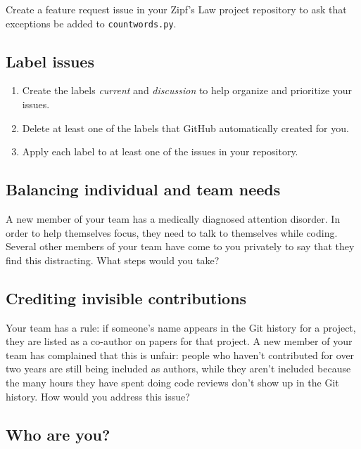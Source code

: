 \documentclass[
]{krantz}
\providecommand{\tightlist}{%
  \setlength{\itemsep}{0pt}\setlength{\parskip}{0pt}}
\begin{document}
Create a feature request issue in your Zipf's Law project repository
to ask that exceptions be added to \texttt{countwords.py}.

\hypertarget{teams-ex-label}{%
\subsection{Label issues}\label{teams-ex-label}}

\begin{enumerate}
\def\labelenumi{\arabic{enumi}.}
\tightlist
\item
  Create the labels \emph{current} and \emph{discussion}
  to help organize and prioritize your issues.
\item
  Delete at least one of the labels that GitHub automatically created for you.
\item
  Apply each label to at least one of the issues in your repository.
\end{enumerate}

\hypertarget{teams-ex-balancing}{%
\subsection{Balancing individual and team needs}\label{teams-ex-balancing}}

A new member of your team has a medically diagnosed attention disorder.
In order to help themselves focus,
they need to talk to themselves while coding.
Several other members of your team have come to you privately
to say that they find this distracting.
What steps would you take?

\hypertarget{teams-ex-invisible}{%
\subsection{Crediting invisible contributions}\label{teams-ex-invisible}}

Your team has a rule:
if someone's name appears in the Git history for a project,
they are listed as a co-author on papers for that project.
A new member of your team has complained that this is unfair:
people who haven't contributed for over two years are still being included as authors,
while they aren't included because the many hours they have spent doing code
reviews don't show up in the Git history.
How would you address this issue?

\hypertarget{teams-ex-members}{%
\subsection{Who are you?}\label{teams-ex-members}}
\end{document}
